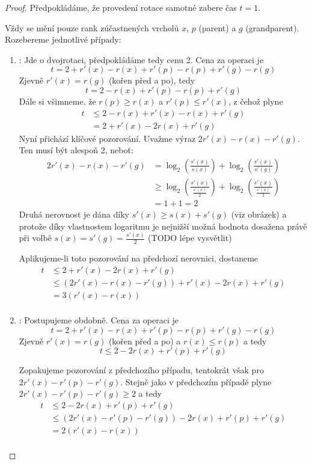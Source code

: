 \documentclass[11pt]{report} %
\numberwithin{equation}{section}
\begin{document}
\begin{proof}
Předpokládáme, že provedení rotace samotné zabere čas $t = 1$. 

Vždy se mění pouze rank zúčastnených vrcholů $x$, $p$ (parent) a $g$ (grandparent). Rozebereme jednotlivé případy:
\begin{enumerate}
	\item \textbf{}:
	 Jde o dvojrotaci, předpokládáme tedy cenu 2. Cena za operaci je
	 $$t = 2 + r'(x) - r(x) + r'(p) - r(p) + r'(g) - r(g)$$
	 Zjevně $r'(x) = r(g)$ (kořen před a po), tedy
 	 $$t = 2 - r(x) + r'(p) - r(p) + r'(g)$$
 	 Dále si všimneme, že $r(p) \geq r(x)$ a $r'(p) \leq r'(x)$, z čehož plyne
 	 \begin{align*}
	 	t 	&\leq 2 - r(x) + r'(x) - r(x) + r'(g)\\
	 		&= 2 + r'(x) - 2r(x) + r'(g)
 	 \end{align*}
	Nyní přichází klíčové pozorování. Uvažme výraz $2r'(x) - r(x) - r'(g)$. Ten musí být alespoň 2, neboť: 	 
	\begin{align*}
		2r'(x) - r(x) - r'(g) &= \log_2\left(\frac{s'(x)}{s(x)}\right) + \log_2\left(\frac{s'(x)}{s'(g)}\right)\\
							  &\geq \log_2\left(\frac{s'(x)}{\frac{s'(x)}{2}}\right) + \log_2\left(\frac{s'(x)}{\frac{s'(x)}{2}}\right)\\
							  & = 1 + 1 = 2
	\end{align*}
	Druhá nerovnost je dána díky $s'(x) \geq s(x) + s'(g)$ (viz obrázek) a protože díky vlastnostem logaritmu je nejnižší možná hodnota dosažena právě při volbě $s(x) = s'(g) = \frac{s'(x)}{2}$ (TODO lépe vysvětlit)

	Aplikujeme-li toto pozorování na předchozí nerovnici, dostaneme	
    \begin{align*}
	t 	&\leq 2 + r'(x) - 2r(x) + r'(g) \\
		&\leq (2r'(x) - r(x) - r'(g)) + r'(x) - 2r(x) + r'(g) \\
		&= 3(r'(x) - r(x)) \\
	\end{align*}
	
	\item \textbf{}:
	Postupujeme obdobně. Cena za operaci je 
	$$t = 2 + r'(x) - r(x) + r'(p) - r(p) + r'(g) - r(g)$$
	Zjevně $r'(x) = r(g)$ (kořen před a po) a $r(x) \leq r(p)$ a tedy
	$$t \leq 2 - 2r(x) + r'(p) + r'(g)$$
	
	Zopakujeme pozorování z předchozího případu, tentokrát však pro	$2r'(x) - r'(p) - r'(g)$. Stejně jako v předchozím případě plyne $2r'(x) - r'(p) - r'(g) \geq 2$ a tedy
	\begin{align*}
	t 	&\leq 2 - 2r(x) + r'(p) + r'(g) \\
		&\leq (2r'(x) - r'(p) - r'(g)) - 2r(x) + r'(p) + r'(g) \\
		&= 2(r'(x) - r(x)) \\
	\end{align*}
		

\end{enumerate}
\end{proof}
\end{document}
